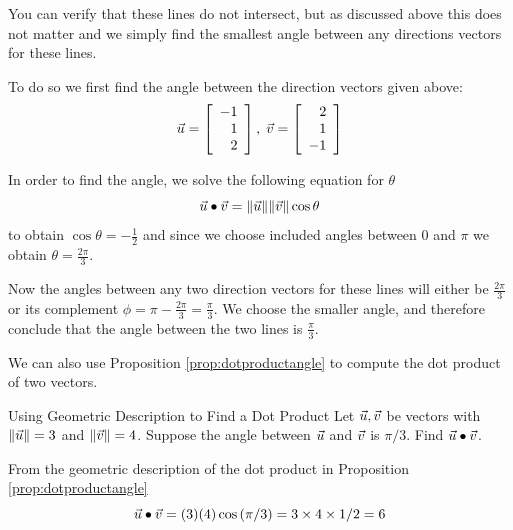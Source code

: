 \begin{solution}
You can verify that these lines do not intersect, but as discussed
above this does not matter and we simply find the smallest angle
between any directions vectors for these lines.

To do so  we first find the angle
between the direction vectors given above:
\begin{equation*}
\vec{u}=\left[
\begin{array}{r}
-1 \\
1 \\
2
\end{array}
\right],\;
\vec{v}=\left[
\begin{array}{r}
2 \\
1 \\
-1
\end{array}
\right]
\end{equation*}

In order to find the angle, we solve the following equation for $\theta$
\begin{equation*}
\vec{u}\bullet \vec{v}=\| \vec{u}\| \| \vec{v}
\| \cos \theta
\end{equation*}
to obtain $\cos \theta = -\frac{1}{2}$ and since we choose included
angles between $0$ and $\pi$ we obtain $\theta = \frac{2 \pi}{3}$.

Now the angles between any two direction vectors for these lines will
either be $\frac{2 \pi}{3}$ or its complement $ \phi = \pi -  \frac{2 \pi}{3}
= \frac{\pi}{3}$. We choose the smaller angle, and therefore conclude that the angle between the two lines is $\frac{\pi}{3}$.
\end{solution}

We can also use Proposition \ref{prop:dotproductangle} to compute the dot product of two vectors.

\begin{example}{Using Geometric Description to Find a Dot Product}\label{exa:geometricdotproduct}
Let $\vec{u},\vec{v}$ be vectors with $ \| \vec{u} \| = 3$ and $\| \vec{v} \| = 4$. 
Suppose the angle between $\vec{u}$ and $\vec{v}$ is $\pi / 3$. Find $\vec{u}\bullet \vec{v}$.
\end{example}

\begin{solution}
From the geometric description of the dot product in Proposition \ref{prop:dotproductangle}
\begin{equation*}
\vec{u}\bullet \vec{v}=(3)(4) \cos \left( \pi / 3\right) =3\times
4\times 1/2=6
\end{equation*}
\end{solution}

